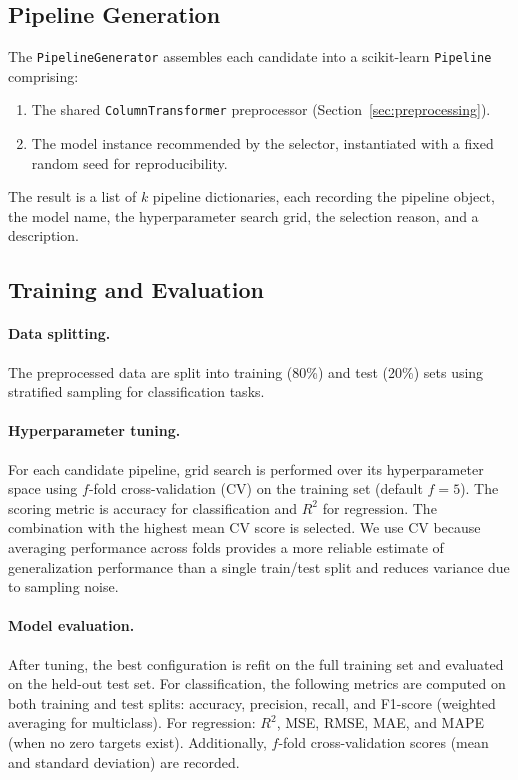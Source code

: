 \documentclass[conference]{IEEEtran}
\begin{document}
   \subsection{Pipeline Generation}
   \label{sec:pipeline_gen}

   The \texttt{PipelineGenerator} assembles each candidate into a scikit-learn \texttt{Pipeline} comprising:
   \begin{enumerate}
   \item The shared \texttt{ColumnTransformer} preprocessor (Section~\ref{sec:preprocessing}).
   \item The model instance recommended by the selector, instantiated with a fixed random seed for reproducibility.
   \end{enumerate}
   The result is a list of $k$ pipeline dictionaries, each recording the pipeline object, the model name, the hyperparameter search grid, the selection reason, and a description.

   \subsection{Training and Evaluation}
   \label{sec:training}

   \paragraph{Data splitting.}
   The preprocessed data are split into training (80\%) and test (20\%) sets using stratified sampling for classification tasks.

   \paragraph{Hyperparameter tuning.}
    For each candidate pipeline, grid search is performed over its hyperparameter space using $f$-fold cross-validation (CV) on the training set (default $f=5$). The scoring metric is accuracy for classification and $R^2$ for regression. The combination with the highest mean CV score is selected. We use CV because averaging performance across folds provides a more reliable estimate of generalization performance than a single train/test split and reduces variance due to sampling noise.

   \paragraph{Model evaluation.}
   After tuning, the best configuration is refit on the full training set and evaluated on the held-out test set.
   For classification, the following metrics are computed on both training and test splits: accuracy, precision, recall, and F1-score (weighted averaging for multiclass).
   For regression: $R^2$, MSE, RMSE, MAE, and MAPE (when no zero targets exist).
   Additionally, $f$-fold cross-validation scores (mean and standard deviation) are recorded.
\end{document}
